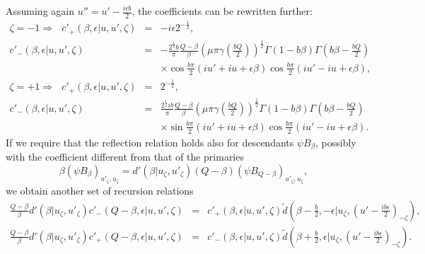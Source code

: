 \documentclass[a4paper,12pt]{article}
\newcommand{\tfrac}[2]{{\textstyle\frac{#1}{#2}}}
\newcommand{\ep}{{\epsilon}}
\begin{document}
 Assuming again $u''=u'-\frac{i\ep b}{2}$, the coefficients
 can be rewritten further:
\begin{eqnarray}
 \zeta=-1 \Rightarrow ~~~
  c'_+(\beta,\ep|u,u',\zeta)
   &=& -i\ep 2^{-\frac{1}{2}},
 \nonumber \\
  c'_-(\beta,\ep|u,u',\zeta)
   &=& -\frac{2^{\frac{1}{2}}b}{\pi}
       \frac{Q-\beta}{\beta}
      (\mu\pi\gamma(\tfrac{bQ}{2}))^{\frac{1}{2}}
      \Gamma(1-b\beta)\Gamma(b\beta-\tfrac{bQ}{2})
 \nonumber \\ && \times
      \cos\tfrac{b\pi}{2}(iu'+iu+\ep\beta)
      \cos\tfrac{b\pi}{2}(iu'-iu+\ep\beta),
 \nonumber \\
 \zeta=+1 \Rightarrow ~~~
  c'_+(\beta,\ep|u,u',\zeta)
   &=& 2^{-\frac{1}{2}},
 \nonumber \\
  c'_-(\beta,\ep|u,u',\zeta)
   &=& \frac{2^{\frac{1}{2}}ib}{\pi}
       \frac{Q-\beta}{\beta}
      (\mu\pi\gamma(\tfrac{bQ}{2}))^{\frac{1}{2}}
      \Gamma(1-b\beta)\Gamma(b\beta-\tfrac{bQ}{2})
 \nonumber \\ && \times
      \sin\tfrac{b\pi}{2}(iu'+iu+\ep\beta)
      \cos\tfrac{b\pi}{2}(iu'-iu+\ep\beta).
\end{eqnarray}
 If we require that the reflection relation holds also for
 descendants $\psi B_\beta$, possibly with the coefficient
 different from that of the primaries
\begin{equation}
  \beta(\psi B_\beta)_{u'_\zeta,u_\zeta}
 = d'(\beta|u_\zeta,u'_\zeta)
  (Q-\beta)(\psi B_{Q-\beta})_{u'_\zeta,u_\zeta},
\end{equation}
 we obtain another set of recursion relations
\begin{eqnarray}
     \tfrac{Q-\beta}{\beta}d'(\beta|u_\zeta,u'_\zeta)
     c'_-(Q-\beta,\ep|u,u',\zeta)
 &=& c'_+(\beta,\ep|u,u',\zeta)
     \tilde{d}(\beta-\tfrac{b}{2},-\ep|u_\zeta,(u'-\tfrac{ib\ep}{2})_{-\zeta}),
 \nonumber \\
      \tfrac{Q-\beta}{\beta}d'(\beta|u_\zeta,u'_\zeta)
      c'_+(Q-\beta,\ep|u,u',\zeta)
 &=&  c'_-(\beta,\ep|u,u',\zeta)
      \tilde{d}(\beta+\tfrac{b}{2},\ep|u_\zeta,(u'-\tfrac{ib\ep}{2})_{-\zeta}).
\label{rcd2}
\end{eqnarray}
\end{document}
